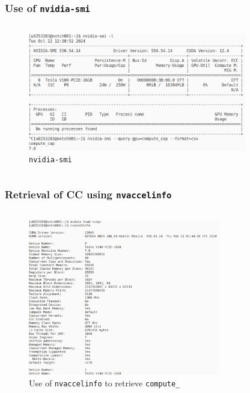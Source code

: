 \begin{frame}
        \frametitle{Use of \texttt{nvidia-smi}}
     \begin{columns}
    \begin{figure}[H]
       \centering
          \includegraphics[width=0.85\textwidth]{./img/nvidia-smi2.png}
          \caption{\small{\texttt{nvidia-smi}}}
    \end{figure}
     \end{columns}
\end{frame}


\begin{frame}
        \frametitle{Retrieval of CC using \texttt{nvaccelinfo}}
     \begin{columns}
    \begin{figure}[H]
       \centering
          \includegraphics[width=0.75\textwidth]{./img/nvaccelinfo.png}
            \caption{\small{Use of \texttt{nvaccelinfo} to retrieve \texttt{compute\_}}}
    \end{figure}
     \end{columns}
\end{frame}



